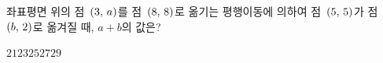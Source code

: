 좌표평면 위의 점~$(3,\mkern3mu a)$를 점~$(8,\mkern3mu 8)$로 옮기는 평행이동에 의하여 점~$(5,\mkern3mu 5)$가 점~$(b,\mkern3mu 2)$로 옮겨질 때, $a+b$의 값은?
\begin{choices32}{$21$}{$23$}{$25$}{$27$}{$29$}\end{choices32}
